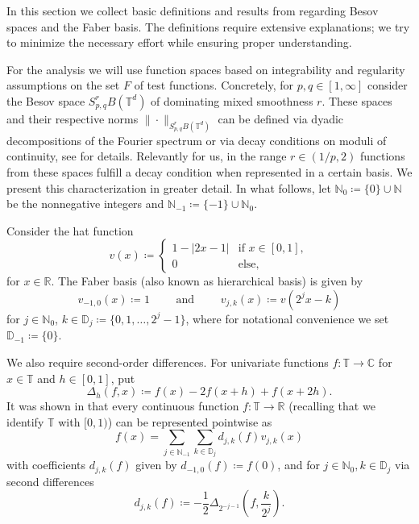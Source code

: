 \documentclass[12pt, a4paper]{article}
\newcommand{\bbR}{{\mathbb{R}}}
\newcommand{\bbT}{{\mathbb{T}}}
\newcommand{\bbN}{{\mathbb{N}}}
\newcommand{\bbD}{{\mathbb{D}}}
\begin{document}
In this section we collect basic definitions and results from \cite{HMOU} regarding Besov spaces and the Faber basis. The definitions require extensive explanations; we try to minimize the necessary effort while ensuring proper understanding.

For the analysis we will use function spaces based on integrability and regularity assumptions on the set $F$ of test functions. Concretely, for $p,q\in [1,\infty]$ consider the Besov space $S^r_{p, q}B(\mathbb T^d)$ of dominating mixed smoothness $r$. These spaces and their respective norms $\|\cdot\|_{S_{p, q}^rB(\bbT^d)}$ can be defined via dyadic decompositions of the Fourier spectrum or via decay conditions on moduli of continuity, see \cite{HMOU} for details. Relevantly for us, in the range $r \in (1/p,2)$ functions from these spaces fulfill a decay condition when represented in a certain basis. We present this characterization in greater detail. In what follows, let $\bbN_0 \coloneqq \{0\} \cup \bbN$ be the nonnegative integers and $\bbN_{-1} \coloneqq \{-1\} \cup \bbN_0$.

Consider the hat function
$$
v(x) \coloneqq \begin{cases}
    1-|2x-1| & \mbox{if } x \in [0,1], \\
    0 & \text{else,}
\end{cases}
$$
for $x \in \bbR$. The Faber basis (also known as hierarchical basis) is given by
$$
v_{-1, 0}(x) \coloneqq  1 \qquad \mbox{ and }\qquad v_{j, k}(x) \coloneqq  v(2^jx-k)
$$
for $j \in \bbN_0$, $k \in \bbD_j \coloneqq \{0, 1, \dots, 2^j-1\}$, where for notational convenience we set $\bbD_{-1} \coloneqq \{0\}$. 

We also require second-order differences. For univariate functions $f:\mathbb{T} \rightarrow \mathbb{C}$ for $x \in \bbT$ and $h \in [0,1]$, put 
\begin{equation}\label{2dif:op:1}
\Delta_h(f,x)\coloneqq f(x)-2 f(x+h)+f(x+2 h).    
\end{equation}
It was shown in \cite{Fab} that every continuous function $f: \mathbb T \rightarrow \bbR$ (recalling that we identify $\bbT$ with $[0, 1)$) can be represented pointwise as
$$
f(x) = \sum_{j \in \bbN_{-1}} \sum_{k \in \bbD_j} d_{j, k}(f) v_{j, k}(x)
$$
with coefficients $d_{j, k}(f)$ given by $d_{-1, 0}(f) \coloneqq  f(0)$, and for $j \in \bbN_0, k \in \bbD_j$ via second differences
$$
d_{j, k}(f) \coloneqq  -\frac12 \Delta_{2^{-j-1}}\left(f,\frac{k}{2^j}\right).
$$
\end{document}
